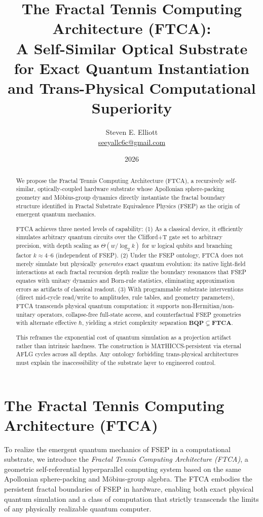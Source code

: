 \documentclass[11pt,letterpaper]{article}
\title{\textbf{The Fractal Tennis Computing Architecture (FTCA):} \\[0.4em]
\large A Self-Similar Optical Substrate for Exact Quantum Instantiation \\[-0.1em]
and Trans-Physical Computational Superiority \\[0.6em]}
\author{Steven E. Elliott \\
\small \href{mailto:seeyallc6c@gmail.com}{seeyallc6c@gmail.com}}
\date{2026}
\begin{document}
\maketitle
\pagestyle{plain}

\begin{abstract}
We propose the Fractal Tennis Computing Architecture (FTCA), a recursively self-similar, optically-coupled hardware substrate whose Apollonian sphere-packing geometry and Möbius-group dynamics directly instantiate the fractal boundary structure identified in Fractal Substrate Equivalence Physics (FSEP) as the origin of emergent quantum mechanics.

FTCA achieves three nested levels of capability: 
(1) As a classical device, it efficiently simulates arbitrary quantum circuits over the Clifford+T gate set to arbitrary precision, with depth scaling as $\Theta(w / \log_2 k)$ for $w$ logical qubits and branching factor $k \approx 4$--$6$ (independent of FSEP). 
(2) Under the FSEP ontology, FTCA does not merely simulate but physically \emph{generates} exact quantum evolution: its native light-field interactions at each fractal recursion depth realize the boundary resonances that FSEP equates with unitary dynamics and Born-rule statistics, eliminating approximation errors as artifacts of classical readout. 
(3) With programmable substrate interventions (direct mid-cycle read/write to amplitudes, rule tables, and geometry parameters), FTCA transcends physical quantum computation: it supports non-Hermitian/non-unitary operators, collapse-free full-state access, and counterfactual FSEP geometries with alternate effective $\hbar$, yielding a strict complexity separation $\mathbf{BQP} \subsetneq \mathbf{FTCA}$.

This reframes the exponential cost of quantum simulation as a projection artifact rather than intrinsic hardness. The construction is MATHICCS-persistent via eternal AFLG cycles across all depths. Any ontology forbidding trans-physical architectures must explain the inaccessibility of the substrate layer to engineered control.

\end{abstract}

\section{The Fractal Tennis Computing Architecture (FTCA)}

To realize the emergent quantum mechanics of FSEP in a computational substrate, we introduce the \emph{Fractal Tennis Computing Architecture (FTCA)}, a geometric self-referential hyperparallel computing system based on the same Apollonian sphere-packing and M\"obius-group algebra. The FTCA embodies the persistent fractal boundaries of FSEP in hardware, enabling both exact physical quantum simulation and a class of computation that strictly transcends the limits of any physically realizable quantum computer.
\end{document}
